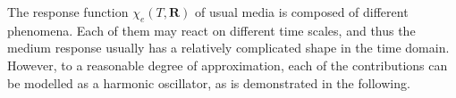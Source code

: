 {%
The response function $\chi_e(T, \mathbf{R})$ of usual media is composed of different phenomena.
Each of them may react on different time scales, and thus the medium response usually has a relatively complicated shape in the time domain. 
However, to a reasonable degree of approximation, each of the contributions can be modelled as a harmonic oscillator, as is demonstrated in the following.
}
